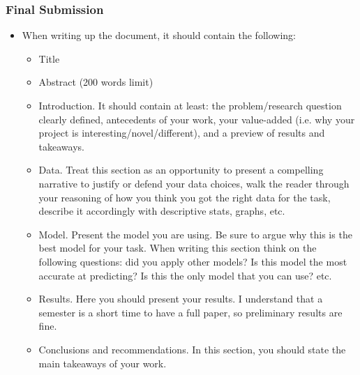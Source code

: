 \documentclass[
  shownotes,
  xcolor={svgnames},
  hyperref={colorlinks,citecolor=DarkBlue,linkcolor=DarkRed,urlcolor=DarkBlue}
  , aspectratio=169]{beamer}
\begin{document}
\begin{frame}
\frametitle{Final Submission}
\begin{itemize}
 \item When writing up the document, it should contain the following:
  \begin{itemize}
    
    \item Title

    \item Abstract (200 words limit)
    \item Introduction. It should contain at least: the problem/research question clearly defined,  antecedents of your work, your value-added (i.e. why your project is interesting/novel/different), and a preview of  results and takeaways.
    \item Data. Treat this section as an opportunity to present a compelling narrative to justify or defend your data choices, walk the reader through your reasoning of how you think you got the right data for the task, describe it accordingly with descriptive stats, graphs, etc.
    \item Model. Present the model you are using.  Be sure to argue why this is the best model for your task. When writing this section think on the following questions: did you apply other models? Is this model the most accurate at predicting?  Is this the only model that you can use? etc. 
    \item Results. Here you should present your results. I understand that a semester is a short time to have a full paper, so preliminary results are fine. 
    \item Conclusions and recommendations. In this section, you should state the main takeaways of your work.
  \end{itemize}
  \end{itemize}
  \end{frame}
\end{document}
